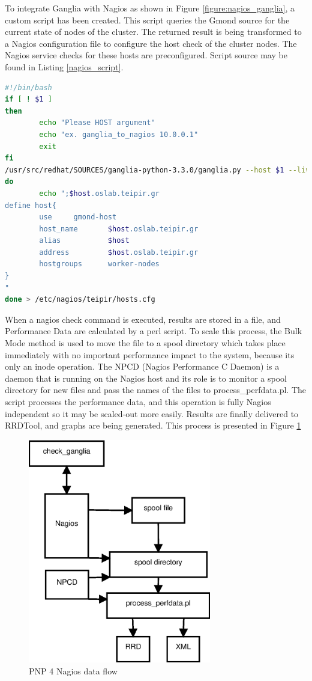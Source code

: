 To integrate Ganglia with Nagios as shown in Figure \ref{figure:nagios_ganglia}, a custom script has been created. This script queries the Gmond source for the current state of nodes of the cluster. The returned result is being transformed to a Nagios configuration file to configure the host check of the cluster nodes. The Nagios service checks for these hosts are preconfigured. Script source may be found in Listing \ref{nagios_script}.

\begin{lstlisting}[language=bash,caption=Ganglia to Nagios script,label=nagios_script]
#!/bin/bash
if [ ! $1 ]
then
        echo "Please HOST argument"
        echo "ex. ganglia_to_nagios 10.0.0.1"
        exit
fi
/usr/src/redhat/SOURCES/ganglia-python-3.3.0/ganglia.py --host $1 --live | while read host
do
        echo ";$host.oslab.teipir.gr
define host{
        use     gmond-host
        host_name       $host.oslab.teipir.gr
        alias           $host
        address         $host.oslab.teipir.gr
        hostgroups      worker-nodes
}
"
done > /etc/nagios/teipir/hosts.cfg
\end{lstlisting}

When a nagios check command is executed, results are stored in a file, and Performance Data are calculated by a perl script. To scale this process, the Bulk Mode method is used to move the file to a spool directory which takes place immediately with no important performance impact to the system, because its only an inode operation. The NPCD (Nagios Performance C Daemon) is a daemon that is running on the Nagios host and its role is to monitor a spool directory for new files and pass the names of the files to process\_perfdata.pl. The script processes the performance data, and this operation is fully Nagios independent so it may be scaled-out more easily. Results are finally delivered to RRDTool, and graphs are being generated. This process is presented in Figure \ref{figure:pnp4nagios}

\begin{figure}[htb]
\centering
 \includegraphics[width=80mm]{images/npcd_pnp4nagios.eps}
\caption{PNP 4 Nagios data flow}
\label{figure:pnp4nagios}
\end{figure}

